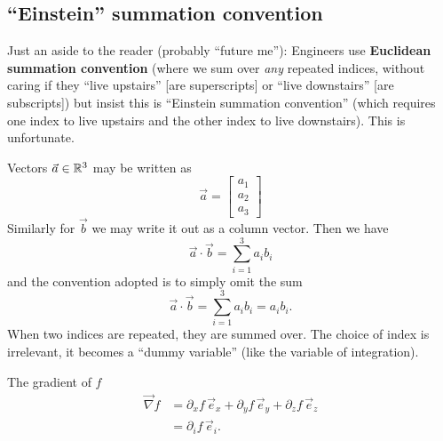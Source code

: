 
\lecture[]{}

\subsection{``Einstein'' summation convention}

\begin{remark}
Just an aside to the reader (probably ``future me''): Engineers use
\textbf{Euclidean summation convention} (where we sum over \emph{any} repeated
indices, without caring if they ``live upstairs'' [are superscripts]
or ``live downstairs'' [are subscripts]) but insist this is ``Einstein
summation convention'' (which requires one index to live upstairs and
the other index to live downstairs). This is unfortunate.
\end{remark}

\begin{node}
Vectors $\vec{a}\in\mathbb{R}^{3}$ may be written as
\begin{equation}
\vec{a} = \begin{bmatrix}a_{1}\\
a_{2}\\
a_{3}
\end{bmatrix}
\end{equation}
Similarly for $\vec{b}$ we may write it out as a column vector. Then
we have
\begin{equation}
\vec{a}\cdot\vec{b}=\sum^{3}_{i=1}a_{i}b_{i}
\end{equation}
and the convention adopted is to simply omit the sum
\begin{equation}
\vec{a}\cdot\vec{b}=\sum^{3}_{i=1}a_{i}b_{i}=a_{i}b_{i}.
\end{equation}
When two indices are repeated, they are summed over. The choice of
index is irrelevant, it becomes a ``dummy variable'' (like the
variable of integration).
\end{node}

\begin{example}
The gradient of $f$
\begin{subequations}
  \begin{align}
\vec{\nabla}f &= \partial_{x}f\,\vec{e}_{x} +
\partial_{y}f\,\vec{e}_{y} + \partial_{z}f\,\vec{e}_{z}\\
&= \partial_{i}f\,\vec{e}_{i}.
  \end{align}
\end{subequations}
\end{example}

